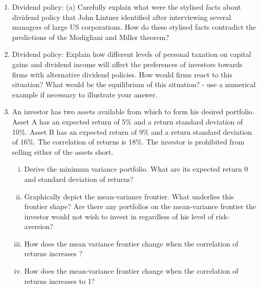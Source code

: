 \documentclass[a4paper,12pt]{article}
\begin{document}
\begin{enumerate}
\item  Dividend policy: 
(a) Carefully explain what were the stylised facts about dividend policy that John Lintner identified after interviewing several managers of large US corporations. How do these stylised facts contradict the predictions of the Modigliani and Miller theorem?  
\item  Dividend policy: Explain how different levels of personal taxation on capital gains and dividend income will affect the preferences of investors towards firms with alternative dividend policies. How would firms react to this situation? What would be the equilibrium of this situation? - use a numerical example if necessary to illustrate your answer.  

\item  An investor has two assets available from which to form his desired portfolio. Asset A has an expected return of 5\% and a return standard deviation of 10\%. Asset B has an expected return of 9\% and a return standard deviation of 16\%. The correlation of returns is 18\%. The investor is prohibited from selling either of the assets short. 
\begin{enumerate}[(i)]
\item Derive the minimum variance portfolio. What are its expected return 0 and standard deviation of returns?

\item Graphically depict the mean-variance frontier. What underlies this frontier shape? Are there any portfolios on the mean-variance frontier the investor would not wish to invest in regardless of his level of risk-aversion? 
\item How does the mean variance frontier change when the correlation of returns increases ? 
\item How does the mean-variance frontier change when the correlation of returns increases to 1?  
\end{enumerate}


\end{enumerate}
\end{document}
